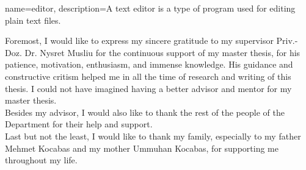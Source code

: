 %
%
%
%



{
  name={editor},
  description={A text editor is a type of program used for editing plain text files.}
}

Foremost, I would like to express my sincere gratitude to my supervisor Priv.-Doz. Dr. Nysret Musliu for the continuous support of my master thesis, for his patience, motivation, enthusiasm, and immense knowledge. His guidance and constructive critism helped me in all the time of research and writing of this thesis. I could not have imagined having a better advisor and mentor for my master thesis. \\

Besides my advisor, I would also like to thank the rest of the people of the Department for their help and support. \\

Last but not the least, I would like to thank my family, especially to my father Mehmet Kocabas and my mother Ummuhan Kocabas, for supporting me throughout my life.